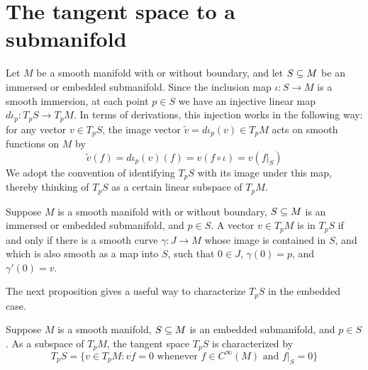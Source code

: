 \section{The tangent space to a submanifold}
Let $M$ be a smooth manifold with or without boundary, and let $S\subseteq M$ be an immersed or embedded submanifold. Since the inclusion map $\iota:S\to M$ is a smooth
immersion, at each point $p\in S$ we have an injective linear map $d\iota_p:T_pS\to T_pM$. In terms of derivations, this injection works in the following way: for any vector $v\in T_pS$, the image vector $\widetilde{v}=d\iota_p(v)\in T_pM$ acts on smooth functions on $M$ by
\[\widetilde{v}(f)=d\iota_p(v)(f)=v(f\circ\iota)=v(f|_S)\]
We adopt the convention of identifying $T_pS$ with its image under this map, thereby
thinking of $T_pS$ as a certain linear subspace of $T_pM$.
\begin{proposition}\label{tangent submani}
Suppose $M$ is a smooth manifold with or without boundary, $S\subseteq M$ is an immersed or embedded submanifold, and $p\in S$. A vector $v\in T_pM$ is in $T_pS$ if and only if there is a smooth curve $\gamma:J\to M$ whose image is contained in $S$, and which is also smooth as a map into $S$, such that $0\in J$, $\gamma(0)=p$, and $\gamma'(0)=v$.
\end{proposition}
The next proposition gives a useful way to characterize $T_pS$ in the embedded case.
\begin{proposition}\label{tangent space submani}
Suppose $M$ is a smooth manifold, $S\subseteq M$ is an embedded submanifold, and $p\in S$. As a subspace of $T_pM$, the tangent space $T_pS$ is characterized by
\[T_pS=\{v\in T_pM:vf=0\text{ whenever }f\in C^\infty(M)\text{ and }f|_S=0\}\]
\end{proposition}
